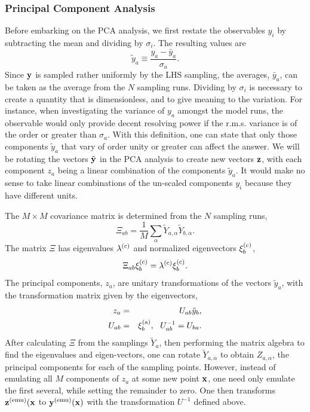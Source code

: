 \subsubsection{Principal Component Analysis}

Before embarking on the PCA analysis, we first restate the observables $y_i$ by subtracting the mean and dividing by $\sigma_i$. The resulting values are
\begin{equation}
\tilde{y}_a\equiv\frac{y_a-\bar{y}_a}{\sigma_a}.
\end{equation}
Since ${\bf y}$ is sampled rather uniformly by the LHS sampling, the averages, $\bar{y}_a$, can be taken as the average from the $N$ sampling runs. Dividing by $\sigma_i$ is necessary to create a quantity that is dimensionless, and to give meaning to the variation. For instance, when investigating the variance of $y_a$ amongst the model runs, the observable would only provide decent resolving power if the r.m.s. variance is of the order or greater than $\sigma_a$. With this definition, one can state that only those components $\tilde{y}_a$ that vary of order unity or greater can affect the answer. We will be rotating the vectors $\tilde{\bf y}$ in the PCA analysis to create new vectors ${\bf z}$, with each component $z_a$ being a linear combination of the components $\tilde{y}_a$. It would make no sense to take linear combinations of the un-scaled components $y_i$ because they have different units.

The $M\times M$ covariance matrix is determined from the $N$ sampling runs,
\begin{equation}
\Xi_{ab}=\frac{1}{M}\sum_\alpha \tilde{Y}_{a,\alpha}\tilde{Y}_{b,\alpha}.
\end{equation}
The matrix $\Xi$ has eigenvalues $\lambda^{\rm(c)}$ and normalized eigenvectors $\xi_b^{\rm(c)}$,
\begin{equation}
\label{eq:Xidef}
\Xi_{ab}\xi_b^{\rm(c)}=\lambda^{\rm(c)} \xi_b^{\rm(c)}.
\end{equation}
The principal components, $z_a$, are unitary transformations of the vectors $\tilde{y}_a$, with the transformation matrix given by the eigenvectors,
\begin{eqnarray}
\label{eq:pcarotation}
z_a&=&U_{ab} \tilde{y}_b,\\
\nonumber
U_{ab}&=&\xi_b^{\rm(a)},~~U^{-1}_{ab}=U_{ba}.
\end{eqnarray}
After calculating $\Xi$ from the samplings $\tilde{Y}_a$, then performing the matrix algebra to find the eigenvalues and eigen-vectors, one can rotate $\tilde{Y}_{a,\alpha}$ to obtain $Z_{a,\alpha}$, the principal components for each of the sampling points. However, instead of emulating all $M$ components of $z_a$ at some new point ${\bf x}$, one need only emulate the first several, while setting the remainder to zero. One then transforms ${\bf z}^{\rm(emu)}({\bf x}$ to ${\bf y}^{\rm(emu)}({\bf x})$ with the transformation $U^{-1}$ defined above.

